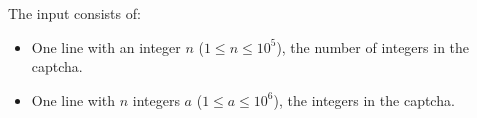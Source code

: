 
  The input consists of:
  \begin{itemize}
    \item One line with an integer $n$ ($1 \le n \le 10^5$), the number of integers in the captcha.
    \item One line with $n$ integers $a$ ($1 \le a \le 10^6$), the integers in the captcha.
  \end{itemize}
